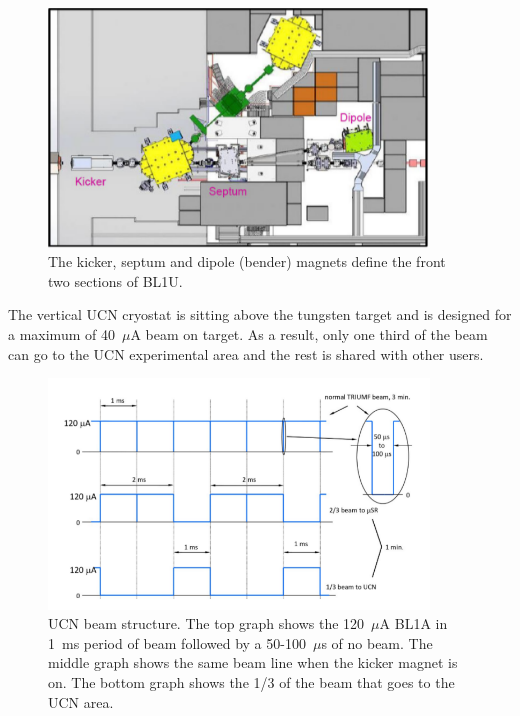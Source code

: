 \begin{figure}[h!]
  \centering
  \includegraphics[width=0.9\textwidth]{magnets.png}
  \caption{The kicker, septum and dipole (bender) magnets define the
    front two sections of BL1U.}
  \label{fig:magnets}
\end{figure}
The vertical UCN cryostat is sitting above the tungsten target and is
designed for a maximum of 40~$\mu$A beam on target. As a result, only
one third of the beam can go to the UCN experimental area and the rest
is shared with other users.

\begin{figure}[h!]
  \centering
  \includegraphics[width=0.9\textwidth]{bl1u.png}
  \caption{UCN beam structure. The top graph shows the 120~$\mu$A BL1A
    in 1~ms period of beam followed by a 50-100~$\mu$s of no
    beam. The middle graph shows the same beam line when the kicker
    magnet is on. The bottom graph shows the 1/3 of the beam that goes
    to the UCN area.}
  \label{fig:bl1u}
\end{figure}

